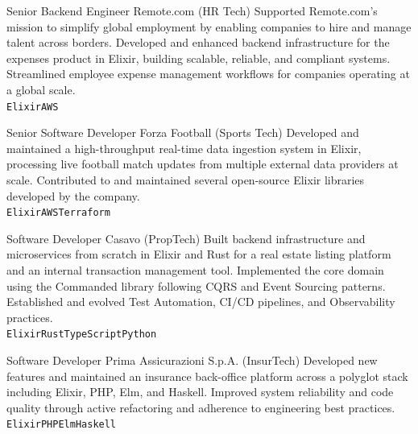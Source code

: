 \documentclass[9pt]{developercv}
\begin{document}
\begin{entrylist}
        {Senior Backend Engineer}
        {Remote.com \textnormal{(HR Tech)}}
        {Supported Remote.com's mission to simplify global employment by enabling companies to hire and manage talent across borders. Developed and enhanced backend infrastructure for the expenses product in Elixir, building scalable, reliable, and compliant systems. Streamlined employee expense management workflows for companies operating at a global scale.\\
       \texttt{Elixir}\slashsep\texttt{AWS}}

        {Senior Software Developer}
        {Forza Football \textnormal{(Sports Tech)}}
        {Developed and maintained a high-throughput real-time data ingestion system in Elixir, processing live football match updates from multiple external data providers at scale. Contributed to and maintained several open-source Elixir libraries developed by the company.\\
       \texttt{Elixir}\slashsep\texttt{AWS}\slashsep\texttt{Terraform}}

        {Software Developer}
        {Casavo \textnormal{(PropTech)}}
        {Built backend infrastructure and microservices from scratch in Elixir and Rust for a real estate listing platform and an internal transaction management tool. Implemented the core domain using the Commanded library following CQRS and Event Sourcing patterns. Established and evolved Test Automation, CI/CD pipelines, and Observability practices.\\
       \texttt{Elixir}\slashsep\texttt{Rust}\slashsep\texttt{TypeScript}\slashsep\texttt{Python}}

        {Software Developer}
        {Prima Assicurazioni S.p.A. \textnormal{(InsurTech)}}
        {Developed new features and maintained an insurance back-office platform across a polyglot stack including Elixir, PHP, Elm, and Haskell. Improved system reliability and code quality through active refactoring and adherence to engineering best practices.\\
       \texttt{Elixir}\slashsep\texttt{PHP}\slashsep\texttt{Elm}\slashsep\texttt{Haskell}}


\end{entrylist}
\end{document}
